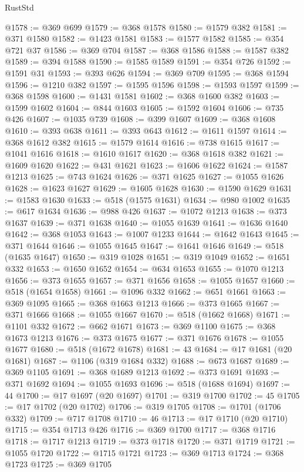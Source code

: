 \begin{lexlean}{RustStd}
\begin{coremodule}
{\begin{coremodule}
{{{{{{{{{{{{{{{{{{{{{{{{{{{{{{{{{{{{{{{{{{{{{{{{{{@1578 := @369 @699
@1579 := @368 @1578
@1580 := @1579 @382
@1581 := @371 @1580
@1582 := @1423 @1581
@1583 := @1577 @1582
@1585 := @354 @721 @37
@1586 := @369 @704
@1587 := @368 @1586
@1588 := @1587 @382
@1589 := @394 @1588
@1590 := @1585 @1589
@1591 := @354 @726
@1592 := @1591 @31
@1593 := @393 @626
@1594 := @369 @709
@1595 := @368 @1594
@1596 := @1210 @382
@1597 := @1595 @1596
@1598 := @1593 @1597
@1599 := @368 @1598
@1600 := @1431 @1581
@1602 := @368 @1600 @382
@1603 := @1599 @1602
@1604 := @844 @1603
@1605 := @1592 @1604
@1606 := @735 @426
@1607 := @1035 @739
@1608 := @399 @1607
@1609 := @368 @1608
@1610 := @393 @638
@1611 := @393 @643
@1612 := @1611 @1597
@1614 := @368 @1612 @382
@1615 := @1579 @1614
@1616 := @738 @1615
@1617 := @1041 @1616
@1618 := @1610 @1617
@1620 := @368 @1618 @382
@1621 := @1609 @1620
@1622 := @431 @1621
@1623 := @1606 @1622
@1624 := @1587 @1213
@1625 := @743 @1624
@1626 := @371 @1625
@1627 := @1055 @1626
@1628 := @1623 @1627
@1629 := @1605 @1628
@1630 := @1590 @1629
@1631 := @1583 @1630
@1633 := @518 (@1575 @1631)
@1634 := @980 @1002
@1635 := @617 @1634
@1636 := @988 @426
@1637 := @1072 @1213
@1638 := @373 @1637
@1639 := @371 @1638
@1640 := @1055 @1639
@1641 := @1636 @1640
@1642 := @368 @1053
@1643 := @1007 @1233
@1644 := @1642 @1643
@1645 := @371 @1644
@1646 := @1055 @1645
@1647 := @1641 @1646
@1649 := @518 (@1635 @1647)
@1650 := @319 @1028
@1651 := @319 @1049
@1652 := @1651 @332
@1653 := @1650 @1652
@1654 := @634 @1653
@1655 := @1070 @1213
@1656 := @373 @1655
@1657 := @371 @1656
@1658 := @1055 @1657
@1660 := @518 (@1654 @1658)
@1661 := @1096 @332
@1662 := @651 @1661
@1663 := @369 @1095
@1665 := @368 @1663 @1213
@1666 := @373 @1665
@1667 := @371 @1666
@1668 := @1055 @1667
@1670 := @518 (@1662 @1668)
@1671 := @1101 @332
@1672 := @662 @1671
@1673 := @369 @1100
@1675 := @368 @1673 @1213
@1676 := @373 @1675
@1677 := @371 @1676
@1678 := @1055 @1677
@1680 := @518 (@1672 @1678)
@1681 := 43
@1684 := @17 @1681 (@20 @1681)
@1687 := @1106 (@319 @1684 @332)
@1688 := @673 @1687
@1689 := @369 @1105
@1691 := @368 @1689 @1213
@1692 := @373 @1691
@1693 := @371 @1692
@1694 := @1055 @1693
@1696 := @518 (@1688 @1694)
@1697 := 44
@1700 := @17 @1697 (@20 @1697)
@1701 := @319 @1700
@1702 := 45
@1705 := @17 @1702 (@20 @1702)
@1706 := @319 @1705
@1708 := @1701 (@1706 @332)
@1709 := @717 @1708
@1710 := 46
@1713 := @17 @1710 (@20 @1710)
@1715 := @354 @1713 @426
@1716 := @369 @1700
@1717 := @368 @1716
@1718 := @1717 @1213
@1719 := @373 @1718
@1720 := @371 @1719
@1721 := @1055 @1720
@1722 := @1715 @1721
@1723 := @369 @1713
@1724 := @368 @1723
@1725 := @369 @1705
}}}}}}}}}}}}}}}}}}}}}}}}}}}}}}}}}}}}}}}}}}}}}}}}}}
\end{coremodule}}
\end{coremodule}
\end{lexlean}
